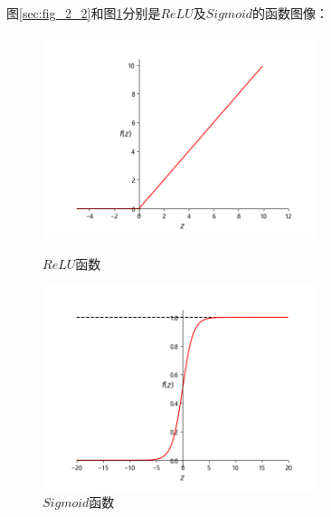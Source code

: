 图\ref{sec:fig_2_2}和图\ref{sec:fig_2_3}分别是$ReLU$及$Sigmoid$的函数图像：

\begin{figure}[htbp]
	\centering
	\begin{minipage}[t]{0.48\textwidth}
		\centering
		\includegraphics[width=8cm]{figures/chapter_2/fig_2_2.png}
		\caption{$ReLU$函数}\label{sec:fig_2_2}
	\end{minipage}
	\begin{minipage}[t]{0.48\textwidth}
		\centering
		\includegraphics[width=8cm]{figures/chapter_2/fig_2_3.png}
	\end{minipage}
	\caption{$Sigmoid$函数}\label{sec:fig_2_3}
\end{figure}


